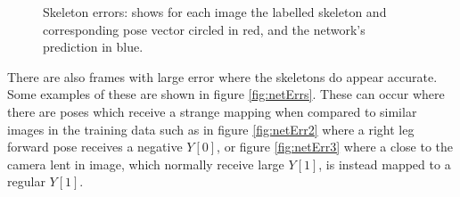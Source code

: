 \documentclass[11pt]{article} %
\begin{document}
\begin{figure}
\centering
{}
\qquad%
%
\caption{Skeleton errors: shows for each image the labelled skeleton and corresponding pose vector circled in red, and the network's prediction in blue. }
\label{fig:skelErrs}
\end{figure}


There are also frames with large error where the skeletons do appear accurate. Some examples of these are shown in figure \ref{fig:netErrs}. These can occur where there are poses which receive a strange mapping when compared to similar images in the training data such as in figure \ref{fig:netErr2} where a right leg forward pose receives a negative $Y[0]$, or figure \ref{fig:netErr3} where a close to the camera lent in image, which normally receive large $Y[1]$, is instead mapped to a regular $Y[1]$. 
\end{document}

